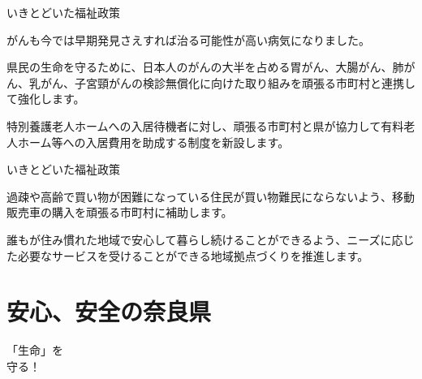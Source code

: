 \documentclass[dvipdfmx]{beamer}
\begin{document}
    \begin{frame}{いきとどいた福祉政策}{}
        \begin{small}
            \begin{description}
                \setlength{\parsep}{.5mm}
                \setlength{\itemsep}{2mm}
                \item[がん検診の無償化] \mbox{}\par
                がんも今では早期発見さえすれば治る可能性が高い病気になりました。\par
                県民の生命を守るために、日本人のがんの大半を占める胃がん、大腸がん、肺がん、乳がん、子宮頸がんの検診無償化に向けた取り組みを頑張る市町村と連携して強化します。
                \item[老人ホームの入居費補助] \mbox{}\par
                特別養護老人ホームへの入居待機者に対し、頑張る市町村と県が協力して有料老人ホーム等への入居費用を助成する制度を新設します。
            \end{description}
        \end{small}
    \end{frame}

    \begin{frame}{いきとどいた福祉政策}{}
        \begin{small}
            \begin{description}
                \setlength{\parsep}{.5mm}
                \setlength{\itemsep}{2mm}
                \item[買い物弱者への支援] \mbox{}\par
                過疎や高齢で買い物が困難になっている住民が買い物難民にならないよう、移動販売車の購入を頑張る市町村に補助します。
                \item[垣根のない福祉サービスの推進] \mbox{}\par
                誰もが住み慣れた地域で安心して暮らし続けることができるよう、ニーズに応じた必要なサービスを受けることができる地域拠点づくりを推進します。
            \end{description}
        \end{small}
    \end{frame}

\section{安心、安全の奈良県}
    \begin{frame}{}{}
        \sectionpage
        \begin{center}
            \begin{large}
                \alert{「生命」を}\\\alert{守る！}
            \end{large}
        \end{center}
    \end{frame}
\end{document}
